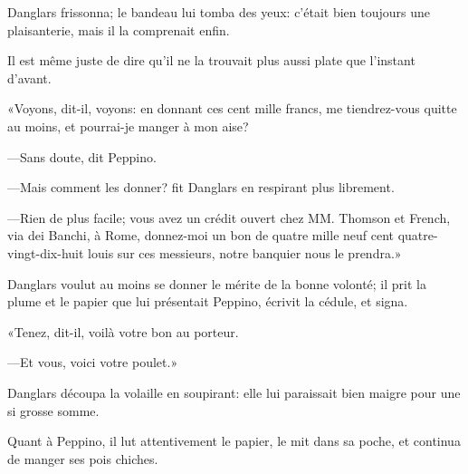 Danglars frissonna; le bandeau lui tomba des yeux: c'était bien toujours une plaisanterie, mais il la comprenait enfin. 

Il est même juste de dire qu'il ne la trouvait plus aussi plate que l'instant d'avant. 

«Voyons, dit-il, voyons: en donnant ces cent mille francs, me tiendrez-vous quitte au moins, et pourrai-je manger à mon aise? 

—Sans doute, dit Peppino. 

—Mais comment les donner? fit Danglars en respirant plus librement. 

—Rien de plus facile; vous avez un crédit ouvert chez MM. Thomson et French, via dei Banchi, à Rome, donnez-moi un bon de quatre mille neuf cent quatre-vingt-dix-huit louis sur ces messieurs, notre banquier nous le prendra.» 

Danglars voulut au moins se donner le mérite de la bonne volonté; il prit la plume et le papier que lui présentait Peppino, écrivit la cédule, et signa. 

«Tenez, dit-il, voilà votre bon au porteur. 

—Et vous, voici votre poulet.» 

Danglars découpa la volaille en soupirant: elle lui paraissait bien maigre pour une si grosse somme. 

Quant à Peppino, il lut attentivement le papier, le mit dans sa poche, et continua de manger ses pois chiches. 